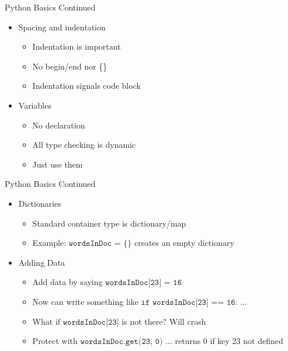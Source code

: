 \documentclass[aspectratio=169]{beamer}
\begin{document}
\begin{frame}{Python Basics Continued}

\begin{itemize}
\item Spacing and indentation
        \begin{itemize}
        \item Indentation is important
	\item No begin/end nor \{\}
	\item Indentation signals code block
        \end{itemize}
\item Variables
        \begin{itemize}
        \item No declaration
	\item All type checking is dynamic
	\item Just use them
        \end{itemize}
\end{itemize}
\end{frame}

\begin{frame}{Python Basics Continued}

\begin{itemize}
\item Dictionaries
        \begin{itemize}
        \item Standard container type is dictionary/map
        \item Example: $\texttt{wordsInDoc = \{\}}$ creates an empty dictionary
	\end{itemize}
\item Adding Data
        \begin{itemize}
	\item Add data by saying $\texttt{wordsInDoc[23] = 16}$
	\item Now can write something like $\texttt{if wordsInDoc[23] == 16:}$ ...
	\item What if $\texttt{wordsInDoc[23]}$ is not there? Will crash
	\item Protect with $\texttt{wordsInDoc.get(23, 0) \ldots}$ returns 0 if key 23 not defined
	\end{itemize}
\end{itemize}
\end{frame}
\end{document}
